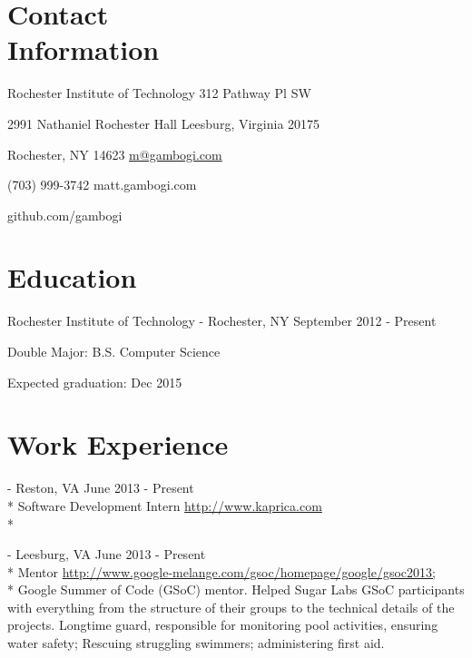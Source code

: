 \documentclass[letter,margin,line]{resume}
\newcommand{\rurl}[1]{\hfill {\footnotesize \url{#1}}}
\newcommand{\rdate}[1]{\hfill {\small #1}}
\renewcommand{\employer}[5]{\item[#1] - #2 \rdate{#3} \\* #4 \rurl{#5} \\*}
\begin{document}
\begin{resume}
\section{\mysidestyle Contact \\ Information} \vspace{2mm}
	\begin{asparablank}
		\item Rochester Institute of Technology \hfill 312 Pathway Pl SW
		\item 2991 Nathaniel Rochester Hall \hfill Leesburg, Virginia 20175
		\item Rochester, NY 14623 \hfill
		\href{mailto:m@gambogi.com}{m@gambogi.com}
		\item (703) 999-3742 \hfill {matt.gambogi.com}
		\item \hfill github.com/gambogi
	\end{asparablank}

\section{\mysidestyle Education}
	\begin{compactdesc}
		\item[Rochester Institute of Technology] - Rochester, NY \rdate{September 2012 - Present}
		\begin{compactitem} { \small
			\item Double Major: B.S. Computer Science
			\item Expected graduation: Dec 2015
		} \end{compactitem}
	\end{compactdesc}

\section{\mysidestyle Work Experience}
	\begin{asparadesc}
		\employer{Kaprica Security}{Reston, VA}{June 2013 - Present}{Software Development Intern}{http://www.kaprica.com}
        	\small
		\employer{Google Summer of Code, Sugar Labs}{Leesburg, VA}{June 2013 - Present}{Mentor}{http://www.google-melange.com/gsoc/homepage/google/gsoc2013;}
        	Google Summer of Code (GSoC) mentor. Helped Sugar Labs GSoC participants with everything from the structure of their groups to the technical details of the projects.
        	\small
        Longtime guard, responsible for monitoring pool activities, ensuring water safety; Rescuing struggling swimmers; administering first aid.
		\normalsize
		\\
		

\end{asparadesc}
\end{resume}
\end{document}

